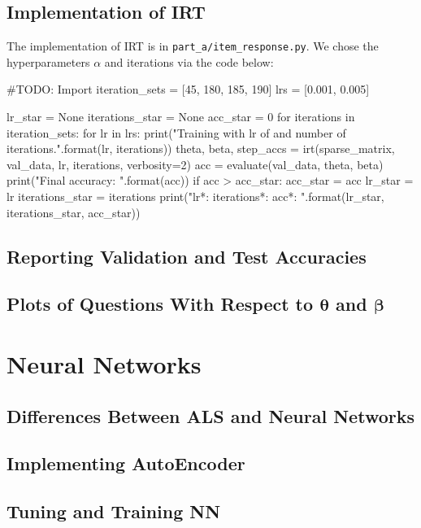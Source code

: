 \documentclass{article}
\begin{document}
    \subsection{Implementation of IRT}
    The implementation of IRT is in \verb|part_a/item_response.py|. We chose the hyperparameters $\alpha$ and iterations via the code below:

    \begin{pyblock}[IRT]
        #TODO: Import 
        iteration_sets = [45, 180, 185, 190]
        lrs = [0.001, 0.005]

        lr_star = None
        iterations_star = None
        acc_star = 0
        for iterations in iteration_sets:
            for lr in lrs:
                print("Training with lr of {} and {} number of iterations.".format(lr, iterations))
                theta, beta, step_accs = irt(sparse_matrix, val_data, lr, iterations, verbosity=2)
                acc = evaluate(val_data, theta, beta)
                print("Final accuracy: {}".format(acc))
                if acc > acc_star:
                    acc_star = acc
                    lr_star = lr
                    iterations_star = iterations
        print("lr*: {} iterations*: {} acc*: {}".format(lr_star, iterations_star, acc_star))
    \end{pyblock}

    \subsection{Reporting Validation and Test Accuracies}
    \subsection{Plots of Questions With Respect to $\bm{\theta}$ and $\bm{\beta}$}

    \pagebreak

    \section{Neural Networks}
    \subsection{Differences Between ALS and Neural Networks}
    \subsection{Implementing AutoEncoder}
    \subsection{Tuning and Training NN}
\end{document}
